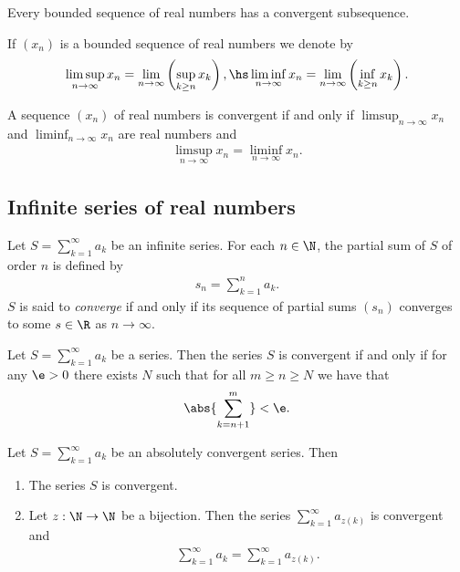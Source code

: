 \documentclass{article}
\begin{document}
\begin{theorem}
	Every bounded sequence of real numbers has a convergent subsequence.
\end{theorem}

\begin{definition}[Notes 1.5]
	If $(x_n)$ is a bounded sequence of real numbers we denote by
	\begin{align*}
		\limsup_{n\to\infty} x_n = \lim_{n\to\infty}\left(\sup_{k\geq n}x_k\right),\hs
		\liminf_{n\to\infty} x_n = \lim_{n\to\infty}\left(\inf_{k\geq n}x_k\right).
	\end{align*}
\end{definition}

\begin{theorem}[Notes 1.6]
	A sequence $(x_n)$ of real numbers is convergent if and only if $\limsup_{n\to\infty}x_n$
	and $\liminf_{n\to\infty}x_n$ are real numbers and
	\begin{align*}
		\limsup_{n\to\infty}x_n =\liminf_{n\to\infty} x_n.
	\end{align*}
\end{theorem}

\subsection{Infinite series of real numbers}

\begin{definition}[Notes 1.6]
	Let $S=\sum_{k=1}^\infty a_k$ be an infinite series. For each $n\in\N$, the partial
	sum of $S$ of order $n$ is defined by
	\begin{align*}
		s_n = \sum_{k=1}^n a_k.
	\end{align*}
	$S$ is said to \emph{converge} if and only if its sequence of partial sums $(s_n)$
	converges to some $s\in\R$ as $n\to\infty$.
\end{definition}

\begin{theorem}
	Let $S=\sum_{k=1}^\infty a_k$ be a series. Then the series $S$ is convergent
	if and only if for any $\e>0$ there exists $N$ such that for all $m\geq n\geq N$
	we have that
	\begin{align*}
		\abs{\sum_{k=n+1}^m}<\e.
	\end{align*}
\end{theorem}

\begin{theorem}[Notes 1.8]
	Let $S=\sum_{k=1}^\infty a_k$ be an absolutely convergent series. Then
	\begin{enumerate}
		\item The series $S$ is convergent.
		\item Let $z:\N\to\N$ be a bijection. Then the series $\sum_{k=1}^\infty a_{z(k)}$
		      is convergent and \begin{align*}
			      \sum_{k=1}^\infty a_k = \sum_{k=1}^\infty a_{z(k)}.
		      \end{align*}
	\end{enumerate}
\end{theorem}
\end{document}

